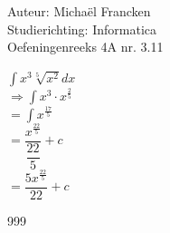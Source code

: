 \documentclass[a4paper]{article}
\newcommand{\dint}{\displaystyle\int}
\begin{document}
\noindent \large Auteur: Michaël Francken \\
\noindent \large Studierichting: Informatica\\
\noindent \large Oefeningenreeks 4A nr. 3.11\\

\medskip

\normalsize

$\displaystyle\int x^3\sqrt[5]{x^2}dx$\\

$\Rightarrow\dint x^3 \cdot x^{\tfrac{2}{5}}$\\

$=\dint x^{\tfrac{17}{5}}$\\

$=\dfrac{x^{\tfrac{22}{5}}}{\dfrac{22}{5}}+c$\\

$=\dfrac{5x^{\tfrac{22}{5}}}{22}+c$\\

\begin{thebibliography}{999}
\end{thebibliography}
\end{document}
